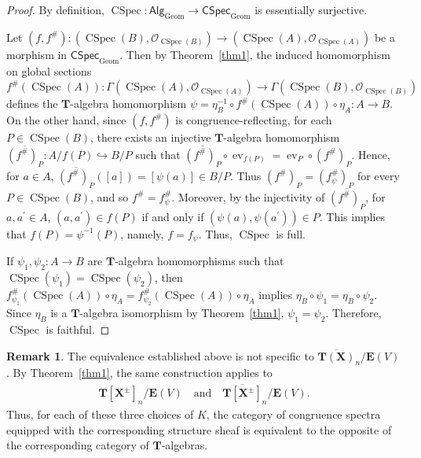 \documentclass[a4paper,12pt]{amsart}
\theoremstyle{plain}
\theoremstyle{definition}
\newtheorem{remark}[theorem]{Remark}
\begin{document}
\begin{proof}
By definition, $\operatorname{CSpec} : \mathsf{Alg}_{\mathrm{Geom}} \to \mathsf{CSpec}_{\mathrm{Geom}}$ is essentially surjective. 

Let $(f,f^{\#}): (\operatorname{CSpec}(B), \mathcal{O}_{\operatorname{CSpec}(B)}) \to (\operatorname{CSpec}(A), \mathcal{O}_{\operatorname{CSpec}(A)})$ be a morphism in $\mathsf{CSpec}_{\mathrm{Geom}}$.
Then by Theorem~\ref{thm1}, the induced homomorphism on global sections $f^{\#}(\operatorname{CSpec}(A)) : \Gamma(\operatorname{CSpec}(A),\mathcal{O}_{\operatorname{CSpec}(A)}) \to \Gamma(\operatorname{CSpec}(B), \mathcal{O}_{\operatorname{CSpec}(B)})$ defines the $\boldsymbol{T}$-algebra homomorphism $\psi = \eta_B^{-1} \circ f^{\#}(\operatorname{CSpec}(A)) \circ \eta_A : A \to B$.
On the other hand, since $(f, f^{\#})$ is congruence-reflecting, for each $P \in \operatorname{CSpec}(B)$, there exists an injective $\boldsymbol{T}$-algebra homomorphism $\overline{(f^{\#})_P}:A/f(P) \hookrightarrow B/P$ such that $\overline{(f^{\#})_P} \circ \operatorname{ev}_{f(P)} =\operatorname{ev}_P \circ (f^{\#})_P$.
Hence, for $a \in A$, $\overline{(f^{\#})_P}([a]) = [\psi(a)] \in B / P$.
Thus $(f^{\#})_P = (f_{\psi}^{\#})_P$ for every $P \in \operatorname{CSpec}(B)$, and so $f^{\#} = f_{\psi}^{\#}$.
Moreover, by the injectivity of $\overline{(f^{\#})_P}$, for $a, a^{\prime} \in A$, $(a, a^{\prime}) \in f(P)$ if and only if $(\psi(a), \psi(a^{\prime})) \in P$.
This implies that $f(P) = \psi^{-1}(P)$, namely, $f = f_{\psi}$.
Thus, $\operatorname{CSpec}$ is full.

If $\psi_1, \psi_2 : A \to B$ are $\boldsymbol{T}$-algebra homomorphisms such that $\operatorname{CSpec}(\psi_1) = \operatorname{CSpec}(\psi_2)$, then $f_{\psi_1}^{\#}(\operatorname{CSpec}(A)) \circ \eta_A = f_{\psi_2}^{\#}(\operatorname{CSpec}(A)) \circ \eta_A$ implies $\eta_B \circ \psi_1 = \eta_B \circ \psi_2$.
Since $\eta_B$ is a $\boldsymbol{T}$-algebra isomorphism by Theorem~\ref{thm1}, $\psi_1 = \psi_2$.
Therefore, $\operatorname{CSpec}$ is faithful.
\end{proof}

\begin{remark}
    \label{rem3}
The equivalence established above is not specific to $\overline{\boldsymbol{T}(\boldsymbol{X})}_n/\boldsymbol{E}(V)$.
By Theorem~\ref{thm1}, the same construction applies to
\begin{align*}
\boldsymbol{T}[\boldsymbol{X}^{\pm}]_n/\boldsymbol{E}(V)
\quad\text{and}\quad
\overline{\boldsymbol{T}[\boldsymbol{X}^{\pm}]}_n/\boldsymbol{E}(V).
\end{align*}
Thus, for each of these three choices of $K$, the category of congruence spectra equipped with the corresponding structure sheaf is equivalent to the opposite of the corresponding category of $\boldsymbol{T}$-algebras.
\end{remark}
\end{document}
